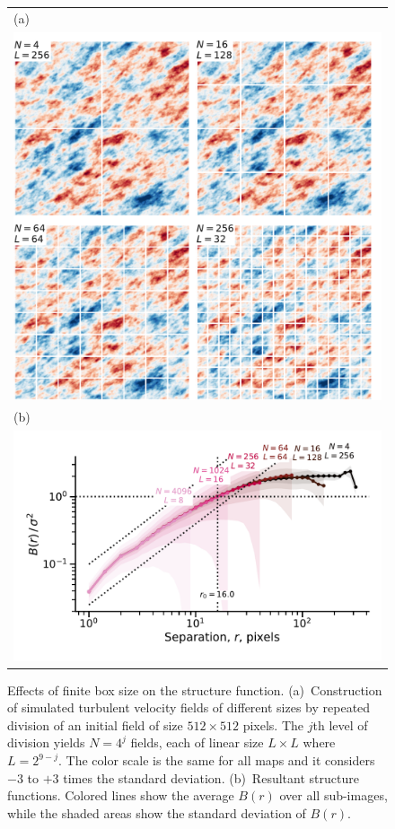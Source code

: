 \documentclass[fleqn,usenatbib, useAMS, a4paper]{mnras}
\begin{document}
\begin{figure}
  \begin{tabular}{@{} l @{}}
    (a)\\
    \includegraphics[width=\linewidth]{Figures/fake-finite-box-images}
    \\[\bigskipamount]
    (b)\\
    \includegraphics[width=\linewidth]{Figures/fake-finite-box-strucfunc}
  \end{tabular}
  \caption{Effects of finite box size on the structure function.
    (a)~Construction of simulated turbulent velocity fields of different sizes
    by repeated division of an initial field of size \(512 \times 512\) pixels.
    The \(j\)th level of division yields \(N = 4^j\) fields,
    each of linear size \(L \times L\) where \(L = 2^{9 - j}\).
    The color scale is the same for all maps and it considers \(- 3\) to \(+ 3\) times the standard deviation.
    (b)~Resultant structure functions.
    Colored lines show the average \(B(r)\) over all sub-images,
    while the shaded areas show the standard deviation of \(B(r)\).
  }
  \label{fig:finite-box}
\end{figure}
\end{document}
